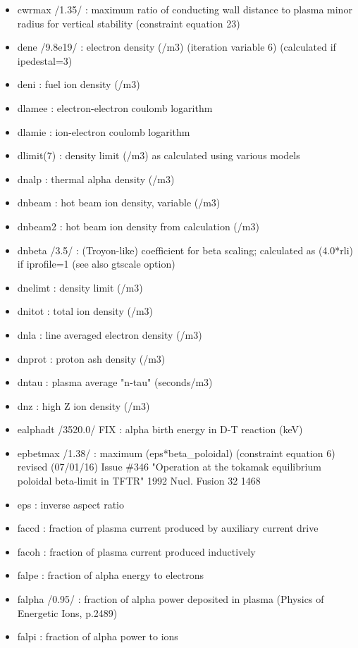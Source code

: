 \documentclass[
]{article}
\begin{document}
\begin{itemize}
\item
  cwrmax /1.35/ : maximum ratio of conducting wall distance to plasma
  minor radius for vertical stability (constraint equation 23)
\item
  dene /9.8e19/ : electron density (/m3) (iteration variable 6)
  (calculated if ipedestal=3)
\item
  deni : fuel ion density (/m3)
\item
  dlamee : electron-electron coulomb logarithm
\item
  dlamie : ion-electron coulomb logarithm
\item
  dlimit(7) : density limit (/m3) as calculated using various models
\item
  dnalp : thermal alpha density (/m3)
\item
  dnbeam : hot beam ion density, variable (/m3)
\item
  dnbeam2 : hot beam ion density from calculation (/m3)
\item
  dnbeta /3.5/ : (Troyon-like) coefficient for beta scaling; calculated
  as (4.0*rli) if iprofile=1 (see also gtscale option)
\item
  dnelimt : density limit (/m3)
\item
  dnitot : total ion density (/m3)
\item
  dnla : line averaged electron density (/m3)
\item
  dnprot : proton ash density (/m3)
\item
  dntau : plasma average "n-tau" (seconds/m3)
\item
  dnz : high Z ion density (/m3)
\item
  ealphadt /3520.0/ FIX : alpha birth energy in D-T reaction (keV)
\item
  epbetmax /1.38/ : maximum (eps*beta\_poloidal) (constraint equation 6)
  revised (07/01/16) Issue \#346 "Operation at the tokamak equilibrium
  poloidal beta-limit in TFTR" 1992 Nucl. Fusion 32 1468
\item
  eps : inverse aspect ratio
\item
  faccd : fraction of plasma current produced by auxiliary current drive
\item
  facoh : fraction of plasma current produced inductively
\item
  falpe : fraction of alpha energy to electrons
\item
  falpha /0.95/ : fraction of alpha power deposited in plasma (Physics
  of Energetic Ions, p.2489)
\item
  falpi : fraction of alpha power to ions

\end{itemize}
\end{document}
